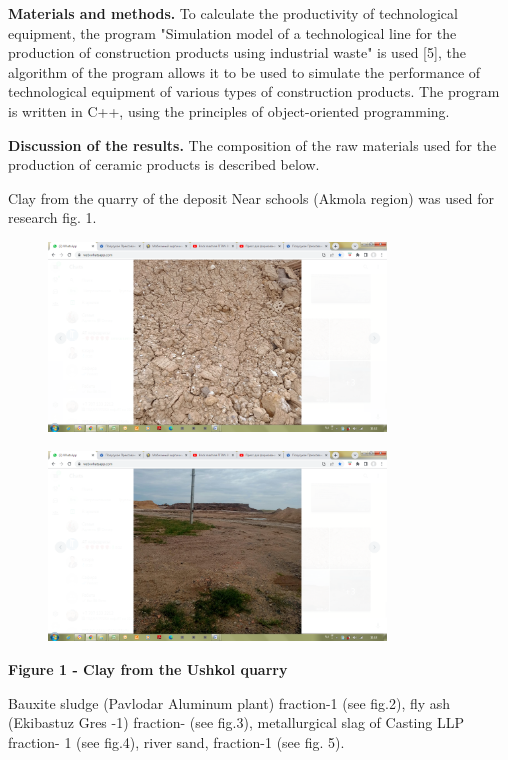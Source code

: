 {\bfseries Materials and methods.} To calculate the productivity of
technological equipment, the program "Simulation model of a
technological line for the production of construction products using
industrial waste" is used {[}5{]}, the algorithm of the program allows
it to be used to simulate the performance of technological equipment of
various types of construction products. The program is written in C++,
using the principles of object-oriented programming.

{\bfseries Discussion of the results.} The composition of the raw materials
used for the production of ceramic products is described below.

Clay from the quarry of the deposit Near schools (Akmola region) was
used for research fig. 1.

\begin{figure}[H]
	\centering
	\includegraphics[width=0.8\textwidth]{assets/266}
	\caption*{}
\end{figure}
\begin{figure}[H]
	\centering
	\includegraphics[width=0.8\textwidth]{assets/267}
	\caption*{}
\end{figure}

{\bfseries Figure 1 - Clay from the Ushkol quarry}

Bauxite sludge (Pavlodar Aluminum plant) fraction-1 (see fig.2), fly ash
(Ekibastuz Gres -1) fraction- (see fig.3), metallurgical slag of Casting
LLP fraction- 1 (see fig.4), river sand, fraction-1 (see fig. 5).

